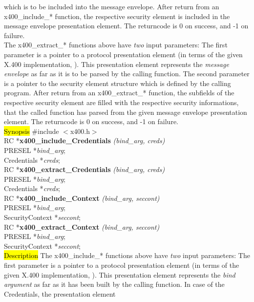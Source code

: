 which is to be included into the message envelope.
After return from an x400\_include\_* function,
the respective security element is included in the
message envelope presentation element.
The returncode is 0 on success, and -1 on failure.
\\[1ex]
The x400\_extract\_* functions above
have {\em two} input parameters:
The first parameter is a pointer to a protocol presentation element
(in terms of the given X.400 implementation,
).
This presentation element
represents the {\em message envelope}
as far as it is to be parsed by the calling function.
The second parameter is a pointer to the security element structure
which is defined by the calling program.
After return from an x400\_extract\_* function,
the subfields of
the respective security element are filled
with the respective security informations,
that the called function has parsed from the given
message envelope presentation element.
The returncode is 0 on success, and -1 on failure.
\\[1em]
\hl{Synopsis}
\#include $<$x400.h$>$ \\ [1ex]
RC *{\bf x400\_include\_Credentials} {\em (bind\_arg, creds)} \\
PRESEL *{\em bind\_arg}; \\
Credentials *{\em creds}; \\ [1ex]
RC *{\bf x400\_extract\_Credentials} {\em (bind\_arg, creds)} \\
PRESEL *{\em bind\_arg}; \\
Credentials *{\em creds}; \\ [1ex]
RC *{\bf x400\_include\_Context} {\em (bind\_arg, seccont)} \\
PRESEL *{\em bind\_arg}; \\
SecurityContext *{\em seccont}; \\ [1ex]
RC *{\bf x400\_extract\_Context} {\em (bind\_arg, seccont)} \\
PRESEL *{\em bind\_arg}; \\
SecurityContext *{\em seccont}; \\
\hl{Description}
The x400\_include\_* functions above
have {\em two} input parameters:
The first parameter is a pointer to a protocol presentation element
(in terms of the given X.400 implementation,
).
This presentation element
represents the {\em bind argument}
as far as it has been built by the calling function.
In case of the Credentials, the presentation element
